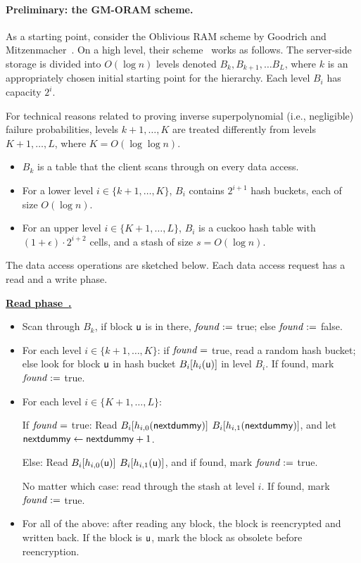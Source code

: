 \paragraph{Preliminary: the GM-ORAM scheme.}
As a starting point, consider the Oblivious RAM scheme
by Goodrich and Mitzenmacher~\cite{oram09}.
On a high level, their scheme~\cite{oram09} works as follows.
The server-side storage is divided into $O(\log n)$ levels 
denoted $B_k, B_{k+1}, \ldots B_L$, where $k$ is an appropriately
chosen initial starting point for the hierarchy.
Each level $B_i$ has capacity $2^i$.

For technical reasons related to proving 
inverse superpolynomial (i.e., negligible) failure
probabilities, levels $k+1, \ldots, K$ are treated
differently from levels $K+1, \ldots, L$, 
where $K = O(\log \log n)$.

\begin{itemize}
\item
$B_k$ is a table that the client scans through on every data access. 
\item
For a lower level $i \in \{k+1, \ldots, K\}$, 
$B_i$ contains
$2^{i+1}$ hash buckets, each of size $O(\log n)$.
\item
For an upper level $i \in \{K+1, \ldots, L\}$,
$B_i$ is a cuckoo hash table with $(1+\epsilon)\cdot 2^{i+2}$ cells,
and a stash of size $s = O(\log n)$.
\end{itemize}

The data access operations are sketched below. Each data access
request has a read and a write phase.

\noindent\begin{boxedminipage}{\textwidth}
\underline{{\bf Read phase~\cite{oram09}.}}
\begin{itemize}
\item
Scan through $B_k$, if block $\textsf{u}$ is in there, 
$\mathit{found} := $ true; else $\mathit{found} := $ false.
\item
For each level $i \in \{k+1, \ldots, K\}$:
if $\mathit{found} = $ true, read a random hash bucket;
else look for block $\textsf{u}$ in hash bucket $B_i[h_i(\textsf{u})]$
in level $B_i$. If found, mark $\mathit{found} := $ true.
\item
For each level $i \in \{K+1, \ldots, L\}$:

If $\mathit{found} = $ true:  Read $B_i[h_{i, 0}({\sf nextdummy})]$ 
$B_i[h_{i, 1}({\sf nextdummy})]$, and 
let ${\sf nextdummy} \leftarrow {\sf nextdummy} + 1$.

Else:   Read $B_i[h_{i, 0}(\textsf{u})]$ 
$B_i[h_{i, 1}(\textsf{u})]$, and 
if found, mark $\mathit{found} := $ true.

No matter which case: read through the stash at level $i$. 
If found, mark $\mathit{found} := $ true.

\item
For all of the above: after reading any block, the block is reencrypted 
and written back. If the block is $\textsf{u}$, mark
the block as obsolete before reencryption.
\end{itemize}
\end{boxedminipage}

